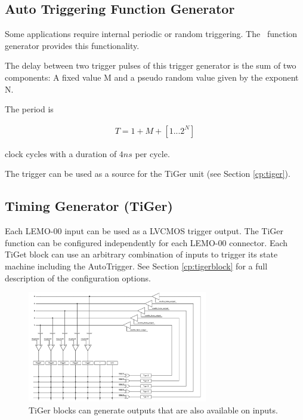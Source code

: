	\subsection{Auto Triggering Function Generator\label{cp:AutoTriggeringFunctionGenerator}}
		Some applications require internal periodic or random triggering. The \deviceName\ function generator provides this functionality.\par

		The delay between two trigger pulses of this trigger generator is the sum of two components: A fixed value M and a pseudo random value given by the exponent N. \par

		The period is

		\begin{align}
			T = 1 + M + [1...2^N]
		\end{align}

		clock cycles with a duration of $4 ns$ per cycle.\par
		
		The trigger can be used as a source for the TiGer unit (see Section \ref{cp:tiger}).
	
	
	\subsection{Timing Generator (TiGer)\label{cp:tiger}}
		Each LEMO-00 input can be used as a LVCMOS trigger output. The TiGer function can be configured independently for each LEMO-00 connector. 
		Each TiGet block can use an arbitrary combination of inputs to trigger its state machine including the AutoTrigger.
		See Section \ref{cp:tigerblock} for a full description of the configuration options.

		\begin{figure}[ht]
			\begin{center}
				\includegraphics[width=0.7\textwidth]{figures/xTDC4_tiger_matrix.pdf}
				\caption{TiGer blocks can generate outputs that are also available on inputs.\label{fig:matrix}}
			\end{center}
		\end{figure}

